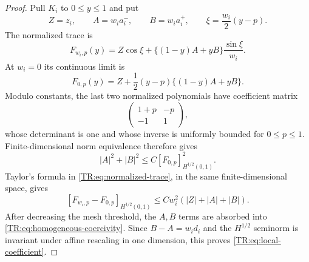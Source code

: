 \begin{proof}
Pull $K_i$ to $0\le y\le1$ and put
\begin{equation*}
 Z=z_i,\qquad A=w_i a_i^-,\qquad B=w_i a_i^+,
 \qquad \xi=\frac{w_i}{2}(y-p).
\end{equation*}
The normalized trace is
\begin{equation}\label{TR:eq:normalized-trace}
 F_{w_i,p}(y)=Z\cos\xi+\{(1-y)A+yB\}\frac{\sin\xi}{w_i}.
\end{equation}
At $w_i=0$ its continuous limit is
\begin{equation}\label{TR:eq:homogeneous-normalized-trace}
 F_{0,p}(y)=Z+\frac12(y-p)\{(1-y)A+yB\}.
\end{equation}
Modulo constants, the last two normalized polynomials have coefficient
matrix
\begin{equation*}
 \begin{pmatrix}1+p&-p\\-1&1\end{pmatrix},
\end{equation*}
whose determinant is one and whose inverse is uniformly bounded for
$0\le p\le1$.  Finite-dimensional norm equivalence therefore gives
\begin{equation}\label{TR:eq:homogeneous-coercivity}
 |A|^2+|B|^2\le C[F_{0,p}]_{H^{1/2}(0,1)}^2.
\end{equation}
Taylor's formula in \eqref{TR:eq:normalized-trace}, in the same
finite-dimensional space, gives
\begin{equation}\label{TR:eq:normalized-perturbation}
 [F_{w_i,p}-F_{0,p}]_{H^{1/2}(0,1)}
 \le Cw_i^2(|Z|+|A|+|B|).
\end{equation}
After decreasing the mesh threshold, the $A,B$ terms are absorbed into
\eqref{TR:eq:homogeneous-coercivity}.  Since
$B-A=w_i d_i$ and the $H^{1/2}$ seminorm is invariant under affine
rescaling in one dimension, this proves \eqref{TR:eq:local-coefficient}.


\end{proof}
